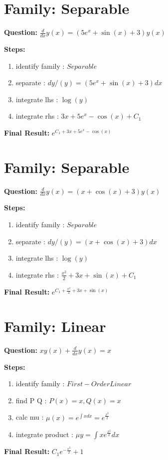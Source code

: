 \documentclass{article}
\begin{document}
\section*{Family: Separable}
\textbf{Question:} $\frac{d}{d x} y{\left(x \right)} = \left(5 e^{x} + \sin{\left(x \right)} + 3\right) y{\left(x \right)}$

\textbf{Steps:}
\begin{enumerate}
\item identify family :  $Separable$
\item separate :  $dy / (y) = (5 e^{x} + \sin{\left(x \right)} + 3) dx$
\item integrate lhs :  $\log{\left(y \right)}$
\item integrate rhs :  $3 x + 5 e^{x} - \cos{\left(x \right)} + C_1$
\end{enumerate}
\textbf{Final Result:} $e^{C_{1} + 3 x + 5 e^{x} - \cos{\left(x \right)}}$

\section*{Family: Separable}
\textbf{Question:} $\frac{d}{d x} y{\left(x \right)} = \left(x + \cos{\left(x \right)} + 3\right) y{\left(x \right)}$

\textbf{Steps:}
\begin{enumerate}
\item identify family :  $Separable$
\item separate :  $dy / (y) = (x + \cos{\left(x \right)} + 3) dx$
\item integrate lhs :  $\log{\left(y \right)}$
\item integrate rhs :  $\frac{x^{2}}{2} + 3 x + \sin{\left(x \right)} + C_1$
\end{enumerate}
\textbf{Final Result:} $e^{C_{1} + \frac{x^{2}}{2} + 3 x + \sin{\left(x \right)}}$

\section*{Family: Linear}
\textbf{Question:} $x y{\left(x \right)} + \frac{d}{d x} y{\left(x \right)} = x$

\textbf{Steps:}
\begin{enumerate}
\item identify family :  $First-Order Linear$
\item find P Q :  $P(x)=x, Q(x)=x$
\item calc mu :  $\mu(x) = e^{\int x dx} = e^{\frac{x^{2}}{2}}$
\item integrate product :  $\mu y = \int x e^{\frac{x^{2}}{2}} dx$
\end{enumerate}
\textbf{Final Result:} $C_{1} e^{- \frac{x^{2}}{2}} + 1$
\end{document}

